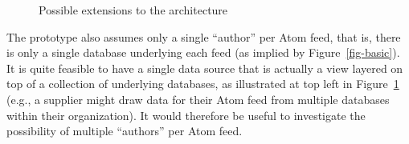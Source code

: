 \documentclass{CRPITStyle}
\begin{document}
\begin{figure}[htb]
	\caption{Possible extensions to the architecture}
	\label{fig-extended}
\end{figure}

The prototype also assumes only a single ``author'' per Atom feed, that
is, there is only a single database underlying each feed (as implied by
Figure~\ref{fig-basic}). It is quite feasible to have a single data
source that is actually a view layered on top of a collection of
underlying databases, as illustrated at top left in
Figure~\ref{fig-extended} (e.g., a supplier might draw data for their
Atom feed from multiple databases within their organization). It would
therefore be useful to investigate the possibility of multiple
``authors'' per Atom feed.
\end{document}
